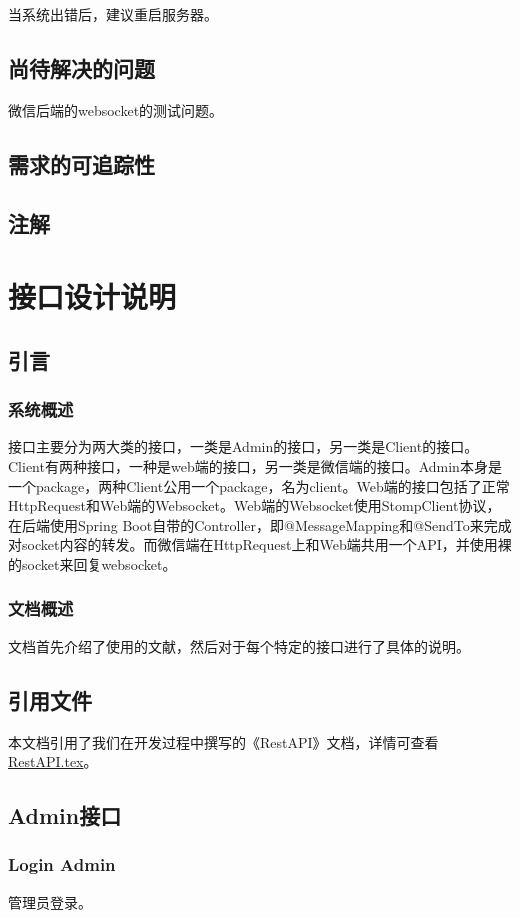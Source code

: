 \documentclass{article}
\begin{document}
当系统出错后，建议重启服务器。
\subsection{尚待解决的问题}
微信后端的websocket的测试问题。
\subsection{需求的可追踪性}
\subsection{注解}

\section{接口设计说明}
\label{接口设计说明}
\subsection{引言}
\subsubsection{系统概述}
接口主要分为两大类的接口，一类是Admin的接口，另一类是Client的接口。Client有两种接口，一种是web端的接口，另一类是微信端的接口。Admin本身是一个package，两种Client公用一个package，名为client。Web端的接口包括了正常HttpRequest和Web端的Websocket。Web端的Websocket使用StompClient协议，在后端使用Spring Boot自带的Controller，即@MessageMapping和@SendTo来完成对socket内容的转发。而微信端在HttpRequest上和Web端共用一个API，并使用裸的socket来回复websocket。
\subsubsection{文档概述}
文档首先介绍了使用的文献，然后对于每个特定的接口进行了具体的说明。
\subsection{引用文件}
本文档引用了我们在开发过程中撰写的《RestAPI》文档，详情可查看\href{https://github.com/wenj/tomatodesign/blob/master/REST%20API.tex}{RestAPI.tex}。

\subsection{Admin接口}

\subsubsection{Login Admin}
管理员登录。
\end{document}
